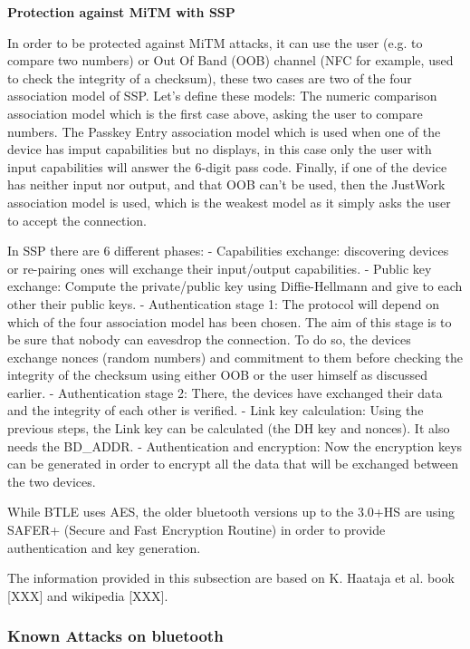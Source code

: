 \textbf{Protection against MiTM with SSP}

In order to be protected against MiTM attacks, it can use the user (e.g. to compare two numbers) or Out Of Band (OOB) channel (NFC for example, used to check the integrity of a checksum), these two cases are two of the four association model of SSP. \linebreak 
Let's define these models:\linebreak 
The numeric comparison association model which is the first case above, asking the user to compare numbers. The Passkey Entry association model which is used when one of the device has imput capabilities but no displays, in this case only the user with input capabilities will answer the 6-digit pass code.
Finally, if one of the device has neither input nor output, and that OOB can't be used, then the JustWork association model is used, which is the weakest model as it simply asks the user to accept the connection. 

In SSP there are 6 different phases:
	- Capabilities exchange: discovering devices or re-pairing ones will exchange their input/output capabilities. \linebreak 
	- Public key exchange: Compute the private/public key using Diffie-Hellmann and give to each other their public keys. \linebreak 
	- Authentication stage 1: The protocol will depend on which of the four association model has been chosen. The aim of this stage is to be sure that nobody can eavesdrop the connection. To do so, the devices exchange nonces (random numbers) and commitment to them before checking the integrity of the checksum using either OOB or the user himself as discussed earlier. \linebreak 
	- Authentication stage 2: There, the devices have exchanged their data and the integrity of each other is verified. \linebreak
	- Link key calculation: Using the previous steps, the Link key can be calculated (the DH key and nonces). It also needs the BD\_ADDR.  \linebreak
	- Authentication and encryption: Now the encryption keys can be generated in order to encrypt all the data that will be exchanged between the two devices. 

 
While BTLE uses AES, the older bluetooth versions up to the 3.0+HS are using SAFER+ (Secure and Fast Encryption Routine) in order to provide authentication and key generation.


The information provided in this subsection are based on K. Haataja et al. book [XXX] and wikipedia [XXX].

\subsubsection{Known Attacks on bluetooth}















